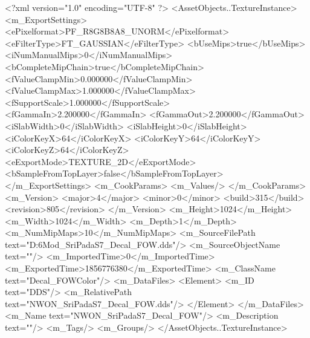 <?xml version="1.0" encoding="UTF-8" ?>
<AssetObjects..TextureInstance>
	<m_ExportSettings>
		<ePixelformat>PF_R8G8B8A8_UNORM</ePixelformat>
		<eFilterType>FT_GAUSSIAN</eFilterType>
		<bUseMips>true</bUseMips>
		<iNumManualMips>0</iNumManualMips>
		<bCompleteMipChain>true</bCompleteMipChain>
		<fValueClampMin>0.000000</fValueClampMin>
		<fValueClampMax>1.000000</fValueClampMax>
		<fSupportScale>1.000000</fSupportScale>
		<fGammaIn>2.200000</fGammaIn>
		<fGammaOut>2.200000</fGammaOut>
		<iSlabWidth>0</iSlabWidth>
		<iSlabHeight>0</iSlabHeight>
		<iColorKeyX>64</iColorKeyX>
		<iColorKeyY>64</iColorKeyY>
		<iColorKeyZ>64</iColorKeyZ>
		<eExportMode>TEXTURE_2D</eExportMode>
		<bSampleFromTopLayer>false</bSampleFromTopLayer>
	</m_ExportSettings>
	<m_CookParams>
		<m_Values/>
	</m_CookParams>
	<m_Version>
		<major>4</major>
		<minor>0</minor>
		<build>315</build>
		<revision>805</revision>
	</m_Version>
	<m_Height>1024</m_Height>
	<m_Width>1024</m_Width>
	<m_Depth>1</m_Depth>
	<m_NumMipMaps>10</m_NumMipMaps>
	<m_SourceFilePath text="D:\Civ6Mod\Terrain\NW\SriPada\NWON_SriPadaS7_Decal_FOW.dds"/>
	<m_SourceObjectName text=""/>
	<m_ImportedTime>0</m_ImportedTime>
	<m_ExportedTime>1856776380</m_ExportedTime>
	<m_ClassName text="Decal_FOWColor"/>
	<m_DataFiles>
		<Element>
			<m_ID text="DDS"/>
			<m_RelativePath text="NWON_SriPadaS7_Decal_FOW.dds"/>
		</Element>
	</m_DataFiles>
	<m_Name text="NWON_SriPadaS7_Decal_FOW"/>
	<m_Description text=""/>
	<m_Tags/>
	<m_Groups/>
</AssetObjects..TextureInstance>

